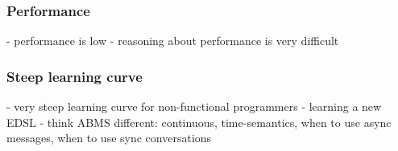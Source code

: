 \subsubsection{Performance}
	- performance is low
	- reasoning about performance is very difficult
	
\subsubsection{Steep learning curve}
	- very steep learning curve for non-functional programmers
	- learning a new EDSL
	- think ABMS different: continuous, time-semantics, when to use async messages, when to use sync conversations